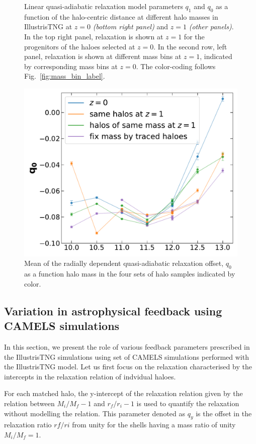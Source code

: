\begin{figure}[htbp]
\caption{Linear quasi-adiabatic relaxation model parameters $q_1$ and $q_0$ as a function of the halo-centric distance at different halo masses in IllustrisTNG at $z=0$ \emph{(bottom right panel)} and $z=1$ \emph{(other panels)}. In the top right panel, relaxation is shown at $z=1$ for the progenitors of the haloes selected at $z=0$. In the second row, left panel, relaxation is shown at different mass bins at $z=1$, indicated by corresponding mass bins at $z=0$. The color-coding follows Fig.~\ref{fig:mass_bin_label}.}
\label{fig:rf-fit-params}
\end{figure}

\begin{figure}[htbp]
\centering
\includegraphics[width=0.6\linewidth]{plots/fit_param_q0_M_T_z01.pdf}
\caption{Mean of the radially dependent quasi-adiabatic relaxation offset, $q_{0}$ as a function halo mass in the four sets of halo samples indicated by color.}
\label{fig:fit-fit-func-q}
\end{figure}










\subsection{Variation in astrophysical feedback using CAMELS simulations}
\label{sec:res-physvar-CAMELS}
In this section, we present the role of various feedback parameters prescribed in the IllustrisTNG simulations using set of CAMELS simulations performed with the IllustrisTNG model. Let us first focus on the relaxation characterised by the intercepts in the relaxation relation of indvidual haloes. 

For each matched halo, the y-intercept of the relaxation relation given by the relation between $M_i/M_f-1$ and $r_f/r_i-1$ is used to quantify the relaxation without modelling the relation. This parameter denoted as $q_y$ is the offset in the relaxation ratio $rf/ri$ from unity for the shells having a mass ratio of unity $M_i/M_f=1$. 

